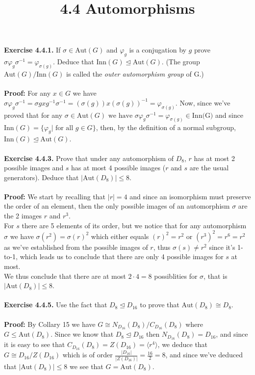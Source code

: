 \documentclass{article}
\title{\textbf{4.4 Automorphisms}}
\begin{document}
	\maketitle
	\textbf{Exercise 4.4.1.} If $\sigma \in \text{Aut}(G)$ and $\varphi_g$ is a conjugation by $g$ prove $\sigma \varphi_g \sigma^{-1} = \varphi_{\sigma(g)}$. Deduce that $\text{Inn}(G) \trianglelefteq \text{Aut}(G)$. (The group $\text{Aut}(G)/\text{Inn}(G)$ is called the \textit{outer automorphism group} of G.) \\ \\
	\textbf{Proof:} For any $x \in G$ we have $\sigma \varphi_g \sigma^{-1} = \sigma gxg^{-1} \sigma^{-1} = (\sigma(g)) x (\sigma(g))^{-1} = \varphi_{\sigma(g)}$. Now, since we've proved that for any $\sigma \in \text{Aut}(G) \text{ we have } \sigma \varphi_g \sigma^{-1} = \varphi_{\sigma(g)} \in \text{Inn(G)}$ and since $\text{Inn}(G) = \{\varphi_g | \text{ for all } g \in G\}$, then, by the definition of a normal subgroup, $\text{Inn}(G) \trianglelefteq \text{Aut}(G)$. \\ \\ 
	\textbf{Exercise 4.4.3.} Prove that under any automorphism of $D_8$, $r$ has at most 2 possible images and $s$ has at most 4 possible images ($r$ and $s$ are the usual generators). Deduce that $|\text{Aut}(D_8)| \leq 8$. \\ \\
	\textbf{Proof:} We start by recalling that $|r| = 4$ and since an isomorphism must preserve the order of an element, then the only possible images of an automorphism $\sigma$ are the 2 images $r$ and $r^3$. \\
	For $s$ there are 5 elements of its order, but we notice that for any automorphism $\sigma$ we have $\sigma(r^2) = \sigma(r)^2$ which either equals $(r)^2 = r^2$ or $(r^3)^2 = r^6 = r^2$ as we've established from the possible images of $r$, thus $\sigma(s) \neq r^2$ since it's 1-to-1, which leads us to conclude that there are only 4 possible images for $s$ at most. \\ 
	We thus conclude that there are at most $2 \cdot 4 = 8$ possiblities for $\sigma$, that is $|\text{Aut}(D_8)| \leq 8$.\\ \\ 
	\textbf{Exercise 4.4.5.} Use the fact that $D_8 \trianglelefteq D_{16}$ to prove that $\text{Aut}(D_8) \cong D_8$. \\ \\
	\textbf{Proof:} By Collary 15 we have $G \cong N_{D_{16}}(D_8)/C_{D_{16}}(D_8)$ where $G \leq \text{Aut}(D_8)$. Since we know that $D_8 \trianglelefteq D_{16}$ then $N_{D_{16}}(D_8) = D_{16}$, and since it is easy to see that $C_{D_{16}}(D_8) = Z(D_{16}) = \langle r^4 \rangle$, we deduce that $G \cong D_{16}/Z(D_{16})$ which is of order $\frac{|D_{16}|}{|Z(D_{16})|} = \frac{16}{2} = 8$, and since we've deduced that $|\text{Aut}(D_8)| \leq 8$ we see that $G = \text{Aut}(D_8)$. \\
\end{document}
